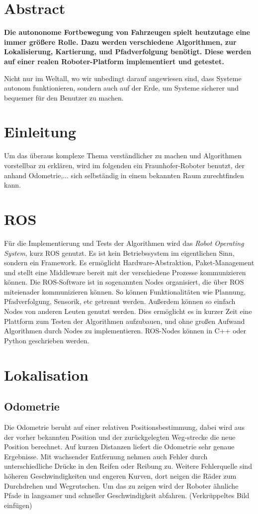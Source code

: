\documentclass[11pt,a4paper]{article}
\begin{document}
\section*{Abstract}
{
\textbf{Die autononome Fortbewegung von Fahrzeugen spielt heutzutage eine immer gr\"o\ss{}ere Rolle. Dazu werden verschiedene Algorithmen, zur Lokalisierung, Kartierung, und Pfadverfolgung ben\"otigt. Diese werden auf einer realen Roboter-Platform implementiert und getestet.}

Nicht nur im Weltall, wo wir unbedingt darauf angewiesen sind, dass Systeme autonom funktionieren, sondern auch auf der Erde, um Systeme sicherer und bequemer f\"ur den Benutzer zu machen. 


\section{Einleitung}
Um das überaus komplexe Thema verst\"andlicher zu machen und Algorithmen vorstellbar zu erkl\"aren, wird im folgenden ein Fraunhofer-Roboter benutzt, der anhand Odometrie,... sich selbst\"andig in einem bekannten Raum zurechtfinden kann.

\section{ROS}
F\"ur die Implementierung und Tests der Algorithmen wird das \textit{Robot Operating System}, kurz ROS genutzt. Es ist kein Betriebssystem im eigentlichen Sinn, sondern ein Framework. Es erm\"oglicht Hardware-Abstraktion, Paket-Management und stellt eine Middleware bereit mit der verschiedene Prozesse kommunizieren k\"onnen. \cite{rosWiki}
Die ROS-Software ist in sogenannten Nodes organisiert, die \"uber ROS miteienader kommunizieren k\"onnen. So k\"onnen Funktionalit\"aten wie Plannung, Pfadverfolgung, Sensorik, etc getrennt werden. Au{\ss}erdem k\"onnen so einfach Nodes von anderen Leuten genutzt werden. Dies erm\"oglicht es in kurzer Zeit eine Plattform zum Testen der Algorithmen aufzubauen, und ohne gro{\ss}en Aufwand Algorithmen durch Nodes zu implementieren. ROS-Nodes k\"onnen in C++ oder Python geschrieben werden. 
 

\section{Lokalisation}
\subsection{Odometrie}
{Die Odometrie beruht auf einer relativen Positionsbestimmung, dabei wird aus der vorher bekannten Position und der zur\"uckgelegten Weg-strecke die neue Position berechnet. Auf kurzen Distanzen liefert die Odometrie sehr genaue Ergebnisse. Mit wachsender Entfernung nehmen auch Fehler durch unterschiedliche Dr\"ucke in den Reifen oder Reibung zu. Weitere Fehlerquelle sind h\"oheren Geschwindigkeiten und engeren Kurven, dort neigen die R\"ader zum Durchdrehen und Wegrutschen. Um das zu zeigen wird der Roboter \"ahnliche Pfade in langsamer und schneller Geschwindigkeit abfahren. 
	(Verkrüppeltes Bild einfügen)
	
}}
\end{document}
